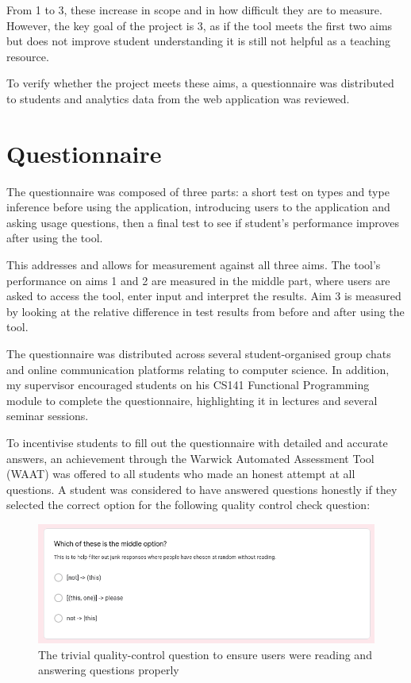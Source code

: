 \documentclass[a4paper,fleqn,oneside,12pt]{report}
\begin{document}
From 1 to 3, these increase in scope and in how difficult they are to measure. However, the key goal of the project is 3, as if the tool meets the first two aims but does not improve student understanding it is still not helpful as a teaching resource.

To verify whether the project meets these aims, a questionnaire was distributed to students and analytics data from the web application was reviewed.
\section{Questionnaire}\label{id:h.yqiowsgjmohq}
The questionnaire was composed of three parts: a short test on types and type inference before using the application, introducing users to the application and asking usage questions, then a final test to see if student’s performance improves after using the tool.

This addresses and allows for measurement against all three aims. The tool’s performance on aims 1 and 2 are measured in the middle part, where users are asked to access the tool, enter input and interpret the results. Aim 3 is measured by looking at the relative difference in test results from before and after using the tool.

The questionnaire was distributed across several student-organised group chats and online communication platforms relating to computer science. In addition, my supervisor encouraged students on his CS141 Functional Programming module to complete the questionnaire, highlighting it in lectures and several seminar sessions.

To incentivise students to fill out the questionnaire with detailed and accurate answers, an achievement through the Warwick Automated Assessment Tool (WAAT) was offered to all students who made an honest attempt at all questions. A student was considered to have answered questions honestly if they selected the correct option for the following quality control check question:

{\centering \begin{figure}[h!]
  \centering
  \includegraphics[width=0.882\linewidth]{images/image32.png}
  \caption{The trivial quality-control question to ensure users were reading and answering questions properly}
\end{figure} \par}
\end{document}

